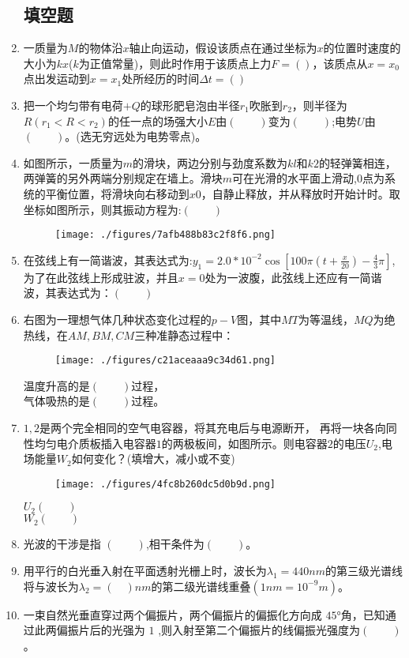 \begin{enumerate}
\subsection{填空题}
\item 一质量为$M$的物体沿$x$轴止向运动，假设该质点在通过坐标为$x$的位置时速度的大小为$kx$($k$为正值常量)，则此时作用于该质点上力$F=()$，该质点从$x=x_0$点出发运动到$x=x_1$处所经历的时间$\Delta t=()$\\
\item 把一个均匀带有电荷$+Q$的球形肥皂泡由半径$r_1$吹胀到$r_2$，则半径为$R(r_1<R<r_2)$的任一点的场强大小$E$由$(\qquad)$变为$(\qquad)$;电势$U$由$(\qquad)$。(选无穷远处为电势零点)。
\item 如图所示，一质量为$m$的滑块，两边分别与劲度系数为$kl$和$k2$的轻弹簧相连，两弹簧的另外两端分别规定在墙上。滑块$m$可在光滑的水平面上滑动,$0$点为系统的平衡位置，将滑块向右移动到$x0$，自静止释放，并从释放时开始计时。取坐标如图所示，则其振动方程为:$(\qquad)$
\begin{figure}[ht]
\centering
\texttt{[image: ./figures/7afb488b83c2f8f6.png]}
\caption{} \label{fig_BKDP06_10}
\end{figure}
\item 在弦线上有一简谐波，其表达式为:$y_1=2.0*10^{-2} \cos[100\pi(t+\frac{x}{20})-\frac{4}{3}\pi]$,为了在此弦线上形成驻波，并且$x=0$处为一波腹，此弦线上还应有一简谐波，其表达式为：$(\qquad)$
\item 右图为一理想气体几种状态变化过程的$p-V$图，其中$MT$为等温线，$MQ$为绝热线，在$AM,BM,CM$三种准静态过程中：\\
\begin{figure}[ht]
\centering
\texttt{[image: ./figures/c21aceaaa9c34d61.png]}
\caption{} \label{fig_BKDP06_9}
\end{figure}
温度升高的是$(\qquad)$过程，\\
气体吸热的是$(\qquad)$过程。
\item $1,2$是两个完全相同的空气电容器，将其充电后与电源断开， 再将一块各向同性均匀电介质板插入电容器$1$的两极板间，如图所示。则电容器$2$的电压$U_2$,电场能量$W_2$如何变化？(填增大，减小或不变)\\
\begin{figure}[ht]
\centering
\texttt{[image: ./figures/4fc8b260dc5d0b9d.png]}
\caption{} \label{fig_BKDP06_8}
\end{figure}
$U_2(\qquad)$\\
$W_2(\qquad)$
\item 光波的干涉是指 $(\qquad)$,相干条件为$(\qquad)$。
\item  用平行的白光垂入射在平面透射光栅上时，波长为$\lambda_1=440nm $的第三级光谱线将与波长为$\lambda_2=(\quad)nm$的第二级光谱线重叠$(1nm=10^{-9}m)$。
\item 一束自然光垂直穿过两个偏振片，两个偏振片的偏振化方向成 $45$°角，已知通过此两偏振片后的光强为 $1$ ,则入射至第二个偏振片的线偏振光强度为$(\qquad)$。

\end{enumerate}
